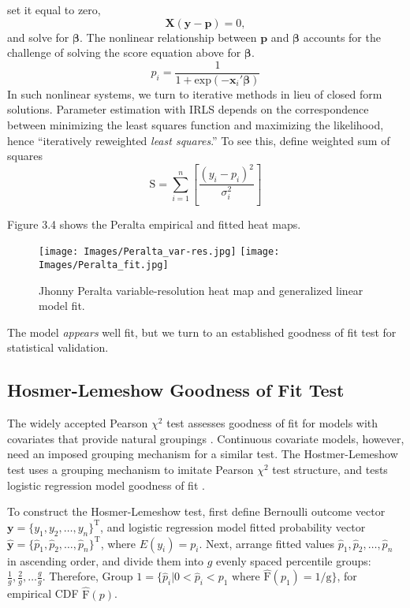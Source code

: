 set it equal to zero,
\begin{equation}
\pmb{X}(\pmb{y} - \pmb{p}) = 0,
\end{equation}
and solve for $\pmb{\beta}$. The nonlinear relationship between $\pmb{p}$ and $\pmb{\beta}$ accounts for the challenge of solving the score equation above for $\pmb{\beta}$.
\begin{equation}
p_{i} = \frac{1}{1 + \text{exp}(-\pmb{x}_{i}'\pmb{\beta})}
\end{equation}
In such nonlinear systems, we turn to iterative methods in lieu of closed form solutions. Parameter estimation with IRLS depends on the correspondence between minimizing the least squares function and maximizing the likelihood, hence ``iteratively reweighted {\it least squares}.'' To see this, define weighted sum of squares
\begin{equation}
\text{S} = \sum_{i = 1}^{n}\left[ \frac{(y_{i} - p_{i})^{2}}{\sigma_{i}^{2}} \right]
\end{equation}



Figure 3.4 shows the Peralta empirical and fitted heat maps.
  \begin{figure}[!ht]
    \centering
    \texttt{[image: Images/Peralta\_var-res.jpg]}
    \texttt{[image: Images/Peralta\_fit.jpg]}
    \caption{Jhonny Peralta variable-resolution heat map and generalized linear model fit.}
  \end{figure}
The model {\it appears} well fit, but we turn to an established goodness of fit test for statistical validation.

\subsection{Hosmer-Lemeshow Goodness of Fit Test} %

The widely accepted Pearson $\chi^{2}$ test assesses goodness of fit for models with covariates that provide natural groupings \citep{Pagano2000}. Continuous covariate models, however, need an imposed grouping mechanism for a similar test. The Hostmer-Lemeshow test uses a grouping mechanism to imitate Pearson $\chi^{2}$ test structure, and tests logistic regression model goodness of fit \citep{Hosmer2013}. 

To construct the Hosmer-Lemeshow test, first define Bernoulli outcome vector $\pmb{y} = \{y_{1}, y_{2}, \dots, y_{n}\}^{\text{T}}$, and logistic regression model fitted probability vector $\hat{\pmb{y}} = \{\hat{p}_{1}, \hat{p}_{2}, \dots, \hat{p}_{n}\}^{\text{T}}$, where $E(y_{i}) = p_{i}$. Next, arrange fitted values $\hat{p}_{1}, \hat{p}_{2}, \dots, \hat{p}_{n}$ in ascending order, and divide them into $g$ evenly spaced percentile groups: $\frac{1}{g}, \frac{2}{g}, \dots \frac{g}{g}$. Therefore, $\text{Group 1} = \{\hat{p}_{i}|0 < \hat{p}_{i} < p_{1} \text{ where } \hat{\text{F}}(p_{1})=1/\text{g} \}$, for empirical CDF $\hat{\text{F}}(p)$. 


